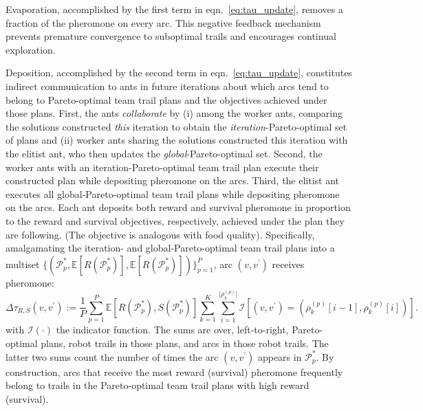 \documentclass[11pt, oneside]{article}
\begin{document}
Evaporation, accomplished by the first term in eqn.~\ref{eq:tau_update}, removes a fraction of the pheromone on every arc. This negative feedback mechanism prevents premature convergence to suboptimal trails and encourages continual exploration.

Deposition, accomplished by the second term in eqn.~\ref{eq:tau_update}, constitutes indirect communication to ants in future iterations about which arcs tend to belong to Pareto-optimal team trail plans and the objectives achieved under those plans.
First, the ants \emph{collaborate} by 
(i) among the worker ants, comparing the solutions constructed \emph{this} iteration to obtain the \emph{iteration}-Pareto-optimal set of plans
and 
(ii) worker ants sharing the solutions constructed this iteration with the elitist ant, who then updates the \emph{global}-Pareto-optimal set.
Second, the worker ants with an iteration-Pareto-optimal team trail plan execute their constructed plan while depositing pheromone on the arcs.
Third, the elitist ant executes all global-Pareto-optimal team trail plans while depositing pheromone on the arcs. Each ant deposits both reward and survival pheromone in proportion to the reward and survival objectives, respectively, achieved under the plan they are following. (The objective is analogous with food quality). 
Specifically, amalgamating the iteration- and global-Pareto-optimal team trail plans into a multiset $\{(\mathcal{P}_p^*, \mathbb{E}[R(\mathcal{P}_p^*)], \mathbb{E}[R(\mathcal{P}_p^*)])\}_{p=1}^P$, arc $(v, v^\prime)$ receives pheromone:
\begin{equation}
	 \Delta \tau_{R,S}(v, v^\prime) := 
	\frac{1}{P} \sum_{p=1}^{P} \mathbb{E}[R(\mathcal{P}^*_p), S(\mathcal{P}^*_p)] 
	\sum_{k=1}^K 
	\sum_{i=1}^{\lvert \rho_k^{(p)}\rvert}
	\mathcal{I} \left[ 
		(v, v^\prime)=(\rho_k^{(p)}[i-1], \rho_k^{(p)}[i])
	\right].
\end{equation}
with $\mathcal{I}(\cdot)$ the indicator function.
The sums are over, left-to-right, Pareto-optimal plans, robot trails in those plans, and arcs in those robot trails. 
The latter two sums count the number of times the arc $(v, v^\prime)$ appears in $\mathcal{P}^*_p$.
By construction, arcs that receive the most reward (survival) pheromone frequently belong to trails in the Pareto-optimal team trail plans with high reward (survival).
\end{document}
